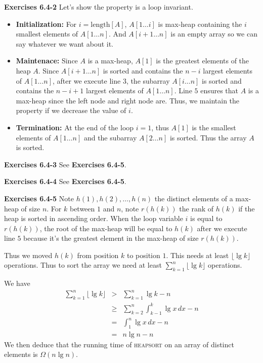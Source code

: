 \documentclass[a4paper,12pt]{article}
\newcommand{\newpar}[1]
{\bigskip \noindent \textbf{Exercises #1} \newline}
\begin{document}
\newpar{6.4-2}
Let's show the property is a loop invariant.
\begin{itemize}
\item \textbf{Initialization: }  For $i = \mathrm{length}[A]$,
  $A[1\ldots i]$ is max-heap containing the $i$ smallest elements of
  $A[1\ldots n]$. And $A[i+1\ldots n]$ is an empty array so we can say
  whatever we want about it.

\item \textbf{Maintenace: } Since $A$ is a max-heap, $A[1]$ is the
  greatest elements of the heap $A$.  Since $A[i+1\ldots n]$ is sorted
  and contains the $n-i$ largest elements of $A[1\ldots n]$, after we
  execute line $3$, the subarray $A[i\ldots n]$ is sorted and contains
  the $n-i+1$ largest elements of $A[1\ldots n]$.  Line $5$ ensures
  that $A$ is a max-heap since the left node and right node are.
  Thus, we maintain the property if we decrease the value of $i$.

\item \textbf{Termination: } At the end of the loop $i = 1$, thus
  $A[1]$ is the smallest elements of $A[1\ldots n]$ and the subarray
  $A[2\ldots n]$ is sorted.  Thus the array $A$ is sorted.
\end{itemize}

\newpar{6.4-3}
See \textbf{Exercises 6.4-5}.

\newpar{6.4-4}
See \textbf{Exercises 6.4-5}.

\newpar{6.4-5} Note $h(1), h(2), \ldots, h(n)$ the distinct elements
of a max-heap of size $n$.  For $k$ between $1$ and $n$, note
$r(h(k))$ the rank of $h(k)$ if the heap is sorted in ascending order.
When the loop variable $i$ is equal to $r(h(k))$, the root of the
max-heap will be equal to $h(k)$ after we execute line $5$ because
it's the greatest element in the max-heap of size $r(h(k))$.

Thus we moved $h(k)$ from position $k$ to position $1$.  This needs at
least $\lfloor \lg k\rfloor$ operations.  Thus to sort the array we
need at least $\sum_{k=1}^n \lfloor \lg k\rfloor$ operations.

We have
\begin{eqnarray*}
  \sum_{k=1}^n \lfloor \lg k\rfloor &>&
  \sum_{k=1}^n \lg k - n \\
  &\ge& \sum_{k=2}^n \int_{k-1}^k \lg x\,dx - n \\
  &=& \int_1^n \lg x\,dx - n \\
  &=& n \lg n - n
\end{eqnarray*}
We then deduce that the running time of \textsc{heapsort} on an array
of distinct elements is $\Omega(n\lg n)$.
\end{document}
